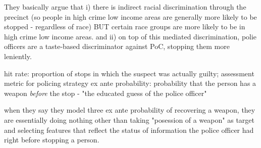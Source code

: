They basically argue that i) there is indirect racial discrimination through the precinct (so people in high crime low income areas are generally more likely to be stopped - regardless of race) BUT certain race groups are more likely to be in high crime low income areas.
and ii) on top of this mediated discrimination, polie officers are a taste-based discriminator against PoC, stopping them more leniently.

hit rate: proportion of stops in which the suspect was actually guilty; assessment metric for policing strategy
ex ante probability: probability that the person has a weapon \textit{before} the stop - "the educated guess of the police officer"


when they say they model three ex ante probability of recovering a weapon, they are essentially doing nothing other than taking "posession of a weapon" as target and selecting features that reflect the status of information the police officer had right before stopping a person.